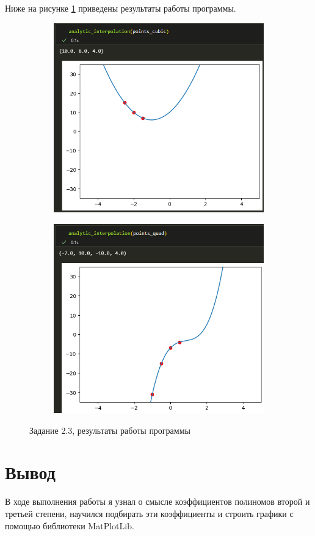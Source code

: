 \documentclass[14pt,a4paper]{extarticle}
\begin{document}
        Ниже на рисунке \ref{fig:2.3-results} приведены результаты работы программы.

\begin{figure}[h!]
    \begin{subfigure}{.5\textwidth}
        \centering
        \includegraphics[width=0.9\linewidth]{figures/2.3-res1.png}
    \end{subfigure}%
    \begin{subfigure}{.5\textwidth}
        \centering
        \includegraphics[width=0.9\linewidth]{figures/2.3-res2.png}
    \end{subfigure}

    \caption{Задание 2.3, результаты работы программы}
    \label{fig:2.3-results}
\end{figure}

\section*{Вывод}

        В ходе выполнения работы я узнал о смысле коэффициентов полиномов
второй и третьей степени, научился подбирать эти коэффициенты и строить
графики с помощью библиотеки MatPlotLib.
\end{document}

